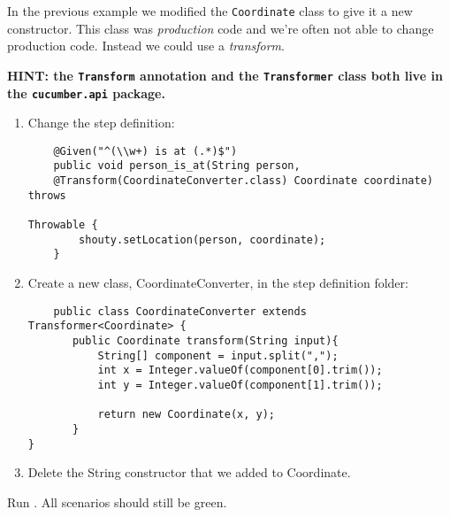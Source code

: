 In the previous example we modified the \texttt{Coordinate} class to give it a new constructor. This class was \emph{production} code and we're often not able to change production code. Instead we could use a \emph{transform}.

\CYBERDOJO
    {
        \textbf{HINT: the \texttt{Transform} annotation and the \texttt{Transformer} class both live in the \texttt{cucumber.api} package.}
    }
    {}

\begin{enumerate}
    \item Change the step definition:

\begin{verbatim}
    @Given("^(\\w+) is at (.*)$")
    public void person_is_at(String person,
    @Transform(CoordinateConverter.class) Coordinate coordinate) throws 
                                                             Throwable {
        shouty.setLocation(person, coordinate);
    }
\end{verbatim}

\item Create a new class, CoordinateConverter, in the step definition folder:

\begin{verbatim}
    public class CoordinateConverter extends Transformer<Coordinate> {
       public Coordinate transform(String input){
           String[] component = input.split(",");
           int x = Integer.valueOf(component[0].trim());
           int y = Integer.valueOf(component[1].trim());
    
           return new Coordinate(x, y);
       }
}
\end{verbatim}

\item Delete the String constructor that we added to Coordinate.
\end{enumerate}

Run \CUKE{}. All scenarios should still be green.


